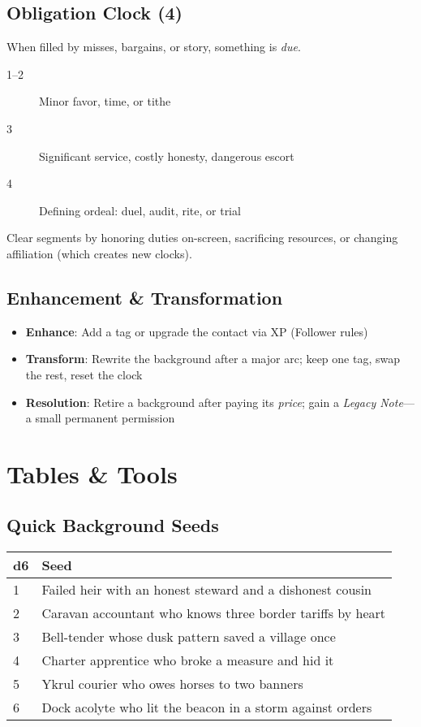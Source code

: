 \subsection*{Obligation Clock (4)}
When filled by misses, bargains, or story, something is \emph{due}.
\begin{description}
\item[1--2] Minor favor, time, or tithe
\item[3] Significant service, costly honesty, dangerous escort
\item[4] Defining ordeal: duel, audit, rite, or trial
\end{description}
Clear segments by honoring duties on-screen, sacrificing resources, or changing affiliation (which creates new clocks).

\subsection*{Enhancement \& Transformation}
\begin{itemize}
\item \textbf{Enhance}: Add a tag or upgrade the contact via XP (Follower rules)
\item \textbf{Transform}: Rewrite the background after a major arc; keep one tag, swap the rest, reset the clock
\item \textbf{Resolution}: Retire a background after paying its \emph{price}; gain a \emph{Legacy Note}—a small permanent permission
\end{itemize}

\section{Tables \& Tools}

\subsection*{Quick Background Seeds}
\small
\begin{tabular}{ll}
\toprule
d6 & Seed \\
\midrule
1 & Failed heir with an honest steward and a dishonest cousin \\
2 & Caravan accountant who knows three border tariffs by heart \\
3 & Bell-tender whose dusk pattern saved a village once \\
4 & Charter apprentice who broke a measure and hid it \\
5 & Ykrul courier who owes horses to two banners \\
6 & Dock acolyte who lit the beacon in a storm against orders \\
\bottomrule
\end{tabular}
\normalsize

